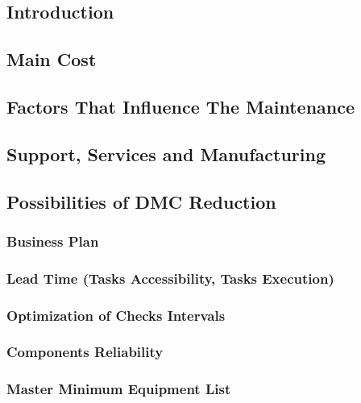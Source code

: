 \subsection{Introduction}
    

\subsection{Main Cost}
    

\subsection{Factors That Influence The Maintenance}
    

\subsection{Support, Services and Manufacturing}
    

\subsection{Possibilities of DMC Reduction}
    
    \subsubsection{Business Plan}
        
    \subsubsection{Lead Time (Tasks Accessibility, Tasks Execution)}
        
    \subsubsection{Optimization of Checks Intervals}
        
    \subsubsection{Components Reliability}
        
    \subsubsection{Master Minimum Equipment List}
        


